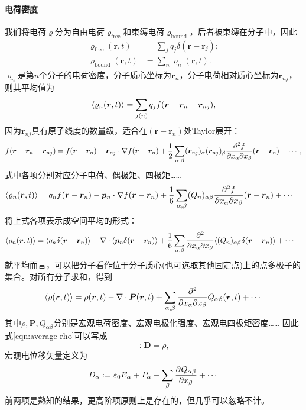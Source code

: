 \paragraph{电荷密度}
我们将电荷$\varrho$分为自由电荷$\varrho_{\mathrm{free}}$和束缚电荷$\varrho_{\mathrm{bound}}$，后者被束缚在分子中，因此
\begin{align*}
    \varrho_{\mathrm{free}}(\bm r,t) &= \sum_jq_j\delta(\bm r - \bm r_j);\\
    \varrho_{\mathrm{bound}}(\bm r,t) &= \sum_n\varrho_n(\bm r,t).
\end{align*}
$\varrho_n$是第$n$个分子的电荷密度，分子质心坐标为$\bm r_n$，分子电荷相对质心坐标为$\bm r_{nj}$，则其平均值为
\[
    \langle\varrho_n(\bm r,t)\rangle = \sum_{j(n)}q_jf(\bm r - \bm r_n - \bm r_{nj}),
\]
因为$\bm r_{nj}$具有原子线度的数量级，适合在$(\bm r - \bm r_n)$处Taylor展开：
\[
    f(\bm r - \bm r_n - \bm r_{nj}) = f(\bm r - \bm r_n) - \bm r_{nj} \cdot \nabla f(\bm r - \bm r_n) + \frac12\sum_{\alpha,\beta}(\bm r_{nj})_\alpha(\bm r_{nj})_\beta\frac{\partial^2{f}}{\partial{x_\alpha}\partial{x_\beta}}(\bm r - \bm r_n) + \cdots,
\]
式中各项分别对应分子电荷、偶极矩、四极矩……
\begin{align*}
    \langle\varrho_n(\bm r,t)\rangle = {}&q_nf(\bm r - \bm r_n) - \bm p_n \cdot \nabla f(\bm r - \bm r_n) + \frac16\sum_{\alpha,\beta}(Q_n)_{\alpha\beta}\frac{\partial^2{f}}{\partial{x_\alpha}\partial{x_\beta}}(\bm r - \bm r_n) + \cdots
\end{align*}
将上式各项表示成空间平均的形式：
\begin{align*}
    \langle\varrho_n(\bm r,t)\rangle = {}&\langle q_n\delta(\bm r - \bm r_n)\rangle - \nabla\cdot\langle\bm p_n\delta(\bm r - \bm r_n)\rangle + \frac16\sum_{\alpha,\beta}\frac{\partial^2{}}{\partial{x_\alpha}\partial{x_\beta}}\langle(Q_n)_{\alpha\beta}\delta(\bm r - \bm r_n)\rangle + \cdots
\end{align*}
就平均而言，可以把分子看作位于分子质心(也可选取其他固定点)上的点多极子的集合。对所有分子求和，得到
\[
    \langle\varrho(\bm r,t)\rangle = \rho(\bm r,t) - \nabla\cdot\bm P(\bm r,t) + \sum_{\alpha,\beta}\frac{\partial^2{}}{\partial{x_\alpha}\partial{x_\beta}}Q_{\alpha\beta}(\bm r,t) + \cdots
\]
其中$\rho,\bm P,Q_{\alpha\beta}$分别是宏观电荷密度、宏观电极化强度、宏观电四极矩密度……
因此式\eqref{eqn:average rho}可以写成 
\[
    \div\bm D = \rho,
\]
宏观电位移矢量定义为
\begin{equation}
    \label{eq:ed-displacement-quadrupole}
    D_\alpha := \varepsilon_0E_\alpha + P_\alpha - \sum_\beta\frac{\partial^{}Q_{\alpha\beta}}{\partial{x_\beta}^{}} + \cdots
\end{equation}
前两项是熟知的结果，更高阶项原则上是存在的，但几乎可以忽略不计。
